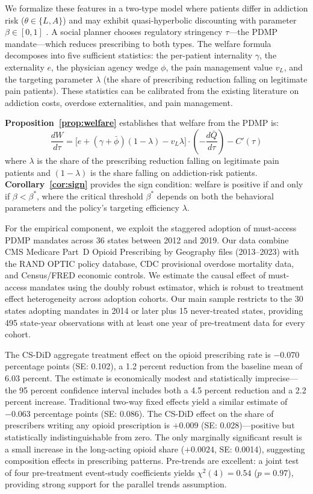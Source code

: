 \documentclass[12pt]{article}
\begin{document}
We formalize these features in a two-type model where patients differ in addiction risk ($\theta \in \{L, A\}$) and may exhibit quasi-hyperbolic discounting with parameter $\beta \in [0,1]$ \citep{laibson1997golden}. A social planner chooses regulatory stringency $\tau$---the PDMP mandate---which reduces prescribing to both types. The welfare formula decomposes into five sufficient statistics: the per-patient internality $\gamma$, the externality $e$, the physician agency wedge $\phi$, the pain management value $v_L$, and the targeting parameter $\lambda$ (the share of prescribing reduction falling on legitimate pain patients). These statistics can be calibrated from the existing literature on addiction costs, overdose externalities, and pain management.

\textbf{Proposition~\ref{prop:welfare}} establishes that welfare from the PDMP is:
\begin{equation*}
\frac{dW}{d\tau} = \Big[e + (\gamma + \bar{\phi})(1-\lambda) - v_L\lambda\Big] \cdot \left(-\frac{d\bar{Q}}{d\tau}\right) - C'(\tau)
\end{equation*}
where $\lambda$ is the share of the prescribing reduction falling on legitimate pain patients and $(1-\lambda)$ is the share falling on addiction-risk patients. \textbf{Corollary~\ref{cor:sign}} provides the sign condition: welfare is positive if and only if $\beta < \beta^*$, where the critical threshold $\beta^*$ depends on both the behavioral parameters and the policy's targeting efficiency $\lambda$.

For the empirical component, we exploit the staggered adoption of must-access PDMP mandates across 36 states between 2012 and 2019. Our data combine CMS Medicare Part~D Opioid Prescribing by Geography files (2013--2023) with the RAND OPTIC policy database, CDC provisional overdose mortality data, and Census/FRED economic controls. We estimate the causal effect of must-access mandates using the \citet{callaway2021difference} doubly robust estimator, which is robust to treatment effect heterogeneity across adoption cohorts. Our main sample restricts to the 30 states adopting mandates in 2014 or later plus 15 never-treated states, providing 495 state-year observations with at least one year of pre-treatment data for every cohort.

The CS-DiD aggregate treatment effect on the opioid prescribing rate is $-0.070$ percentage points (SE: 0.102), a 1.2 percent reduction from the baseline mean of 6.03 percent. The estimate is economically modest and statistically imprecise---the 95 percent confidence interval includes both a 4.5 percent reduction and a 2.2 percent increase. Traditional two-way fixed effects yield a similar estimate of $-0.063$ percentage points (SE: 0.086). The CS-DiD effect on the share of prescribers writing any opioid prescription is $+0.009$ (SE: 0.028)---positive but statistically indistinguishable from zero. The only marginally significant result is a small increase in the long-acting opioid share ($+0.0024$, SE: 0.0014), suggesting composition effects in prescribing patterns. Pre-trends are excellent: a joint test of four pre-treatment event-study coefficients yields $\chi^2(4) = 0.54$ ($p = 0.97$), providing strong support for the parallel trends assumption.
\end{document}
